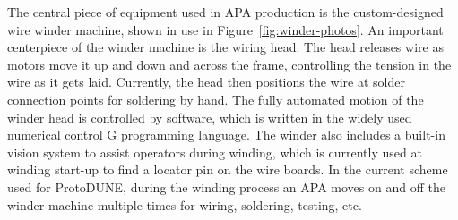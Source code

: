 \begin{comment}
A subset of procedures describing how to perform the step-by-step assembly of an APA was originally created prior to the finalization of the ProtoDUNE APA series of drawings, and assigned drawing numbers. During subsequent assemblies, these instructions have evolved due to the addition of better tooling, fixtures, jigs and more complete drawing documents.  The process steps contained in each procedure have also been changed to create a better match with the B.O.M. (Bill Of Materials) contained on each finalized drawing level.  Table~\ref{tab:assembly-docs} lists what documents are available related to each assembly level.  Currently these documents are being revised to reflect the latest evolution of these procedures that were used to assemble US-APA-4 for ProtoDUNE.

\begin{dunetable}[APA assembly documents]{lcc}{tab:assembly-docs}{Procedure documents for APA assembly.}   
APA Assembly Level & \textbf{Drawing No.} & \textbf{Assembly Instructions Doc.} \\ \toprowrule
APA Frame Assembly & 8757 004 & 8752Doc001 \\ 
                   &          & 8752Doc002 \\ \colhline
Comb Base and Mesh & 8757 003 & 8752Doc003 \\
				   &          & 8752Doc004 \\ \colhline
Four Wire Layers   & 8757 002 & ~~~~~8752Doc005 (X) \\
                   &          & ~~~~~8752Doc006 (V) \\
                   &          & ~~~~~8752Doc007 (U) \\
                   &          & ~~~~~8752Doc008 (G) \\ \colhline
Factory APA        & 8757 030 & 8752Doc009 \\
                   &          & 8752Doc010 \\ \colhline
Crating for Shipment & being finalized & being finalized \\
\end{dunetable}
\end{comment}

The central piece of equipment used in APA production is the custom-designed wire winder machine, shown in use in Figure~\ref{fig:winder-photos}.  An important centerpiece of the winder machine is the wiring head.  The head releases wire as motors move it up and down and across the frame, controlling the tension in the wire as it gets laid. Currently, the head then positions the wire at solder connection points for soldering by hand. The fully automated motion of the winder head is controlled by software, which is written in the widely used numerical control G programming language.  The winder also includes a built-in vision system to assist operators during winding, which is currently used at winding start-up to find a locator pin on the wire boards.  In the current scheme used for ProtoDUNE, during the winding process an APA moves on and off the winder machine multiple times for wiring, soldering, testing, etc.  

